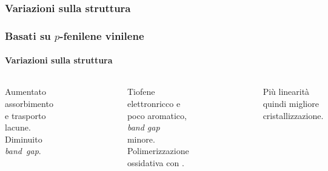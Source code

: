 \subsubsection{Variazioni sulla struttura}\begin{frame}\frametitle{Basati su $p$-fenilene vinilene}\framesubtitle{Variazioni sulla struttura}
 \begin{columns}
{Aumentato assorbimento e trasporto lacune. Diminuito \emph{band~gap}.}
\begin{figure}{}\end{figure}
{Tiofene elettronricco e poco aromatico, \emph{band gap} minore. Polimerizzazione ossidativa con .}
\vspace{-15pt}\begin{figure}{}\end{figure}
{Più linearità quindi migliore cristallizzazione.}
\begin{figure}{}\end{figure}

\end{columns}
\end{frame}
